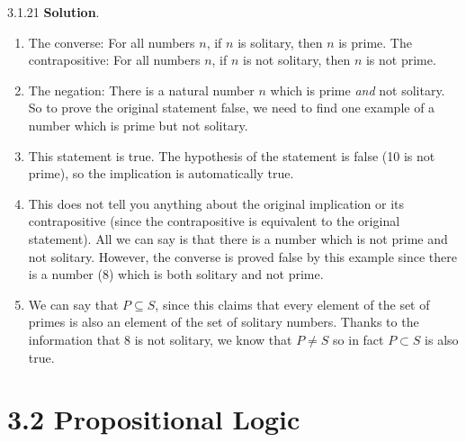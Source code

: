 \documentclass[11pt,]{book}
\theoremstyle{ptxplainnotitle}
\theoremstyle{ptxplaintitle}
\theoremstyle{ptxdefinitionnotitle}
\theoremstyle{ptxdefinitiontitle}
\theoremstyle{ptxdefinitionnotitle}
\theoremstyle{ptxdefinitiontitle}
\theoremstyle{ptxdefinitionnotitle}
\theoremstyle{ptxdefinitiontitle}
\theoremstyle{ptxdefinitiontitlenonumber}
\theoremstyle{ptxdefinitiontitlenonumber}
\numberwithin{equation}{chapter}
\begin{document}
\begin{divisionexercise}{3.1.21}
\textbf{Solution}.\quad%
\hypertarget{p-2230}{}%
\leavevmode%
\begin{enumerate}[label=(\alph*)]
\item\hypertarget{li-1175}{}\hypertarget{p-2231}{}%
The converse: For all numbers \(n\), if \(n\) is solitary, then \(n\) is prime.  The contrapositive: For all numbers \(n\), if \(n\) is not solitary, then \(n\) is not prime.%
\item\hypertarget{li-1176}{}\hypertarget{p-2232}{}%
The negation: There is a natural number \(n\) which is prime \emph{and} not solitary.  So to prove the original statement false, we need to find one example of a number which is prime but not solitary.%
\item\hypertarget{li-1177}{}\hypertarget{p-2233}{}%
This statement is true.  The hypothesis of the statement is false (10 is not prime), so the implication is automatically true.%
\item\hypertarget{li-1178}{}\hypertarget{p-2234}{}%
This does not tell you anything about the original implication or its contrapositive (since the contrapositive is equivalent to the original statement).  All we can say is that there is a number which is not prime and not solitary.  However, the converse is proved false by this example since there is a number (8) which is both solitary and not prime.%
\item\hypertarget{li-1179}{}\hypertarget{p-2235}{}%
We can say that \(P \subseteq S\), since this claims that every element of the set of primes is also an element of the set of solitary numbers.  Thanks to the information that 8 is not solitary, we know that \(P \ne S\) so in fact \(P \subset S\) is also true.%
\end{enumerate}
%
\end{divisionexercise}%
\section*{3.2 Propositional Logic}
\end{document}
